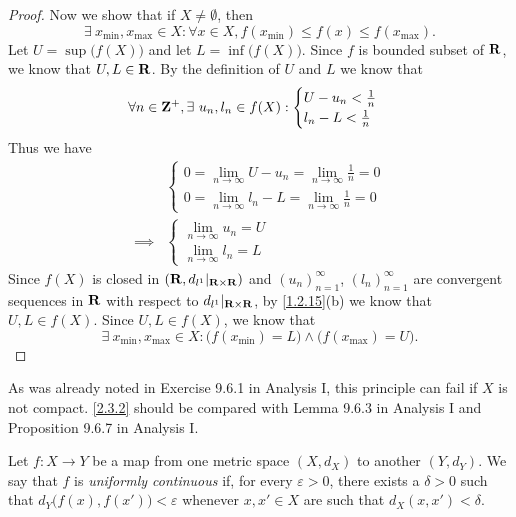 \begin{proof}
  Now we show that if \(X \neq \emptyset\), then
  \[
    \exists\ x_{\min}, x_{\max} \in X : \forall x \in X, f(x_{\min}) \leq f(x) \leq f(x_{\max}).
  \]
  Let \(U = \sup\big(f(X)\big)\) and let \(L = \inf\big(f(X)\big)\).
  Since \(f\) is bounded subset of \(\mathbf{R}\), we know that \(U, L \in \mathbf{R}\).
  By the definition of \(U\) and \(L\) we know that
  \[
    \forall n \in \Z^+, \exists\ u_n, l_n \in f(X) : \begin{cases}
      U - u_n < \frac{1}{n} \\
      l_n - L < \frac{1}{n}
    \end{cases}
  \]
  Thus we have
  \begin{align*}
             & \begin{cases}
                 0 = \lim_{n \to \infty} U - u_n = \lim_{n \to \infty} \frac{1}{n} = 0 \\
                 0 = \lim_{n \to \infty} l_n - L = \lim_{n \to \infty} \frac{1}{n} = 0
               \end{cases} \\
    \implies & \begin{cases}
                 \lim_{n \to \infty} u_n = U \\
                 \lim_{n \to \infty} l_n = L
               \end{cases}
  \end{align*}
  Since \(f(X)\) is closed in \((\mathbf{R}, d_{l^1}|_{\mathbf{R} \times \mathbf{R}})\) and \((u_n)_{n = 1}^\infty\), \((l_n)_{n = 1}^\infty\) are convergent sequences in \(\mathbf{R}\) with respect to \(d_{l^1}|_{\mathbf{R} \times \mathbf{R}}\), by \cref{1.2.15}(b) we know that \(U, L \in f(X)\).
  Since \(U, L \in f(X)\), we know that
  \[
    \exists\ x_{\min}, x_{\max} \in X : \big(f(x_{\min}) = L\big) \land \big(f(x_{\max}) = U\big).
  \]
\end{proof}

\begin{remark}\label{2.3.3}
  As was already noted in Exercise 9.6.1 in Analysis I, this principle can fail if \(X\) is not compact.
  \cref{2.3.2} should be compared with Lemma 9.6.3 in Analysis I and Proposition 9.6.7 in Analysis I.
\end{remark}

\begin{definition}\label{2.3.4}
  Let \(f : X \to Y\) be a map from one metric space \((X, d_X)\) to another \((Y, d_Y)\).
  We say that \(f\) is \emph{uniformly continuous} if, for every \(\varepsilon > 0\), there exists a \(\delta > 0\) such that \(d_Y\big(f(x), f(x')\big) < \varepsilon\) whenever \(x, x' \in X\) are such that \(d_X(x, x') < \delta\).
\end{definition}

